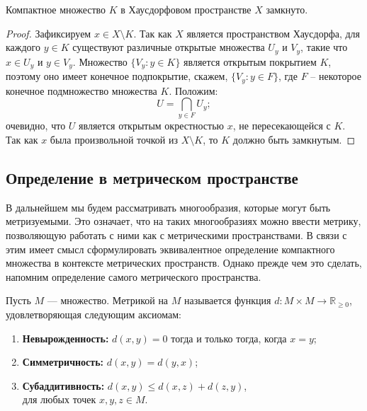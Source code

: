 \begin{statement}
	Компактное множество \( K \) в Хаусдорфовом пространстве \( X \) замкнуто.
\end{statement}
\begin{proof}
	Зафиксируем \( x \in X \setminus K \). Так как \( X \) является пространством Хаусдорфа, для каждого \( y \in K \) существуют различные открытые множества \( U_y \) и \( V_y \), такие что \( x \in U_y \) и \( y \in V_y \). Множество \( \{ V_y : y \in K \} \) является открытым покрытием \( K \), поэтому оно имеет конечное подпокрытие, скажем, \( \{ V_y : y \in F \} \), где \( F \) -- некоторое конечное подмножество множества \( K \). Положим:
\[ U = \bigcap_{y \in F} U_y; \]
очевидно, что \( U \) является открытым окрестностью \( x \), не пересекающейся с \( K \). Так как \( x \) была произвольной точкой из \( X \setminus K \), то \( K \) должно быть замкнутым.
\end{proof}

\subsection{Определение в метрическом пространстве}

В дальнейшем мы будем рассматривать многообразия, которые могут быть метризуемыми. Это означает, что на таких многообразиях можно ввести метрику, позволяющую работать с ними как с метрическими пространствами. В связи с этим имеет смысл сформулировать эквивалентное определение компактного множества в контексте метрических пространств. Однако прежде чем это сделать, напомним определение самого метрического пространства.

\begin{definition}
    Пусть \( M \) — множество. Метрикой на \( M \) называется функция \( d: M \times M \to \mathbb{R}_{\geq 0} \), удовлетворяющая следующим аксиомам:
    \begin{enumerate}
        \item \textbf{Невырожденность:} \( d(x, y) = 0 \) тогда и только тогда, когда \( x = y \);
        \item \textbf{Симметричность:} \( d(x, y) = d(y, x) \);
        \item \textbf{Субаддитивность:} \( d(x, y) \leq d(x, z) + d(z, y) \),
        \\ для любых точек \( x, y, z \in M \).
    \end{enumerate}
\end{definition}

